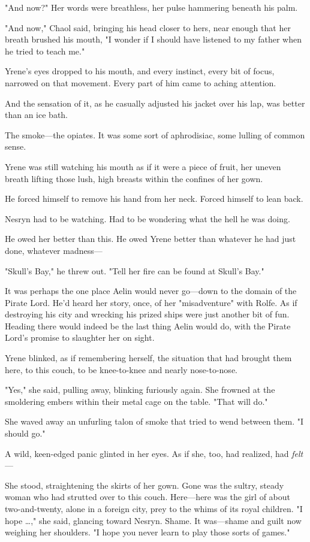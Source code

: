 "And now?"
Her words were breathless, her pulse hammering beneath his palm.

"And now," Chaol said, bringing his head closer to hers, near enough that her breath brushed his mouth, "I wonder if I should have listened to my father when he tried to teach me."

Yrene's eyes dropped to his mouth, and every instinct, every bit of focus, narrowed on that movement.
Every part of him came to aching attention.

And the sensation of it, as he casually adjusted his jacket over his lap, was better than an ice bath.

The smoke---the opiates.
It was some sort of aphrodisiac, some lulling of common sense.

Yrene was still watching his mouth as if it were a piece of fruit, her uneven breath lifting those lush, high breasts within the confines of her gown.

He forced himself to remove his hand from her neck.
Forced himself to lean back.

Nesryn had to be watching.
Had to be wondering what the hell he was doing.

He owed her better than this.
He owed Yrene better than whatever he had just done, whatever madness---

"Skull's Bay," he threw out.
"Tell her fire can be found at Skull's Bay."

It was perhaps the one place Aelin would never go---down to the domain of the Pirate Lord.
He'd heard her story, once, of her "misadventure" with Rolfe.
As if destroying his city and wrecking his prized ships were just another bit of fun.
Heading there would indeed be the last thing Aelin would do, with the Pirate Lord's promise to slaughter her on sight.

Yrene blinked, as if remembering herself, the situation that had brought them here, to this couch, to be knee-to-knee and nearly nose-to-nose.

"Yes," she said, pulling away, blinking furiously again.
She frowned at the smoldering embers within their metal cage on the table.
"That will do."

She waved away an unfurling talon of smoke that tried to wend between them.
"I should go."

A wild, keen-edged panic glinted in her eyes.
As if she, too, had realized, had \emph{felt}---

She stood, straightening the skirts of her gown.
Gone was the sultry, steady woman who had strutted over to this couch.
Here---here was the girl of about two-and-twenty, alone in a foreign city, prey to the whims of its royal children.
"I hope \ldots," she said, glancing toward Nesryn.
Shame.
It was---shame and guilt now weighing her shoulders.
"I hope you never learn to play those sorts of games."

